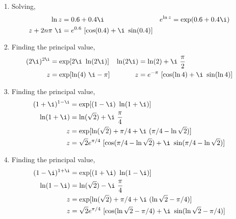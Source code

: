 \begin{enumerate}
    \item Solving,
          \begin{align}
              \ln z         & = 0.6 + 0.4\i                           &
              e^{\ln z}     & = \exp(0.6 + 0.4\i)                       \\
              z + 2n\pi\ \i & = e^{0.6}\ [\cos(0.4) + \i\ \sin (0.4)]
          \end{align}

    \item Finding the principal value,
          \begin{align}
              (2\i)^{2\i} & = \exp[2\i\ \ln(2\i)]                       &
              \ln(2\i)    & = \ln(2) + \i\ \frac{\pi}{2}                  \\
              z           & = \exp[\ln(4)\ \i - \pi]                    &
              z           & = e^{-\pi}\ [\cos(\ln 4) + \i\ \sin(\ln 4)]
          \end{align}

    \item Finding the principal value,
          \begin{align}
              (1 + \i)^{1 - \i} & = \exp[(1 - \i)\ \ln(1 + \i)]       \\
              \ln(1 + \i)       & = \ln(\sqrt{2}) + \i\ \frac{\pi}{4} \\
              z                 & = \exp[\ln(\sqrt{2}) + \pi/4
              + \i\ (\pi/4 - \ln\sqrt{2})]                            \\
              z                 & = \sqrt{2} e^{\pi/4}
              \ [\cos(\pi/4 - \ln\sqrt{2}) + \i\ \sin(\pi/4 - \ln\sqrt{2})]
          \end{align}

    \item Finding the principal value,
          \begin{align}
              (1 - \i)^{1 + \i} & = \exp[(1 + \i)\ \ln(1 - \i)]       \\
              \ln(1 - \i)       & = \ln(\sqrt{2}) - \i\ \frac{\pi}{4} \\
              z                 & = \exp[\ln(\sqrt{2}) + \pi/4
              + \i\ (\ln \sqrt{2}  - \pi/4)]                          \\
              z                 & = \sqrt{2} e^{\pi/4}
              \ [\cos(\ln\sqrt{2} - \pi/4) + \i\ \sin(\ln\sqrt{2} - \pi/4)]
          \end{align}


\end{enumerate}
